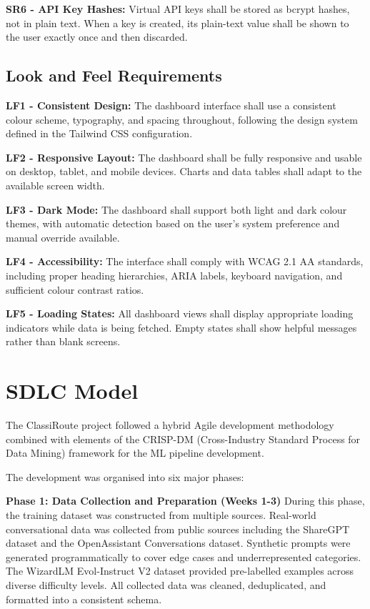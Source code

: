 \documentclass[oneside,12pt,a4paper]{report}
\begin{document}
\textbf{SR6 - API Key Hashes:} Virtual API keys shall be stored as bcrypt hashes, not in plain text. When a key is created, its plain-text value shall be shown to the user exactly once and then discarded.

\subsection{Look and Feel Requirements}

\textbf{LF1 - Consistent Design:} The dashboard interface shall use a consistent colour scheme, typography, and spacing throughout, following the design system defined in the Tailwind CSS configuration.

\textbf{LF2 - Responsive Layout:} The dashboard shall be fully responsive and usable on desktop, tablet, and mobile devices. Charts and data tables shall adapt to the available screen width.

\textbf{LF3 - Dark Mode:} The dashboard shall support both light and dark colour themes, with automatic detection based on the user's system preference and manual override available.

\textbf{LF4 - Accessibility:} The interface shall comply with WCAG 2.1 AA standards, including proper heading hierarchies, ARIA labels, keyboard navigation, and sufficient colour contrast ratios.

\textbf{LF5 - Loading States:} All dashboard views shall display appropriate loading indicators while data is being fetched. Empty states shall show helpful messages rather than blank screens.

\section{SDLC Model}

The ClassiRoute project followed a hybrid Agile development methodology combined with elements of the CRISP-DM (Cross-Industry Standard Process for Data Mining) framework for the ML pipeline development.

The development was organised into six major phases:

\textbf{Phase 1: Data Collection and Preparation (Weeks 1-3)}
During this phase, the training dataset was constructed from multiple sources. Real-world conversational data was collected from public sources including the ShareGPT dataset and the OpenAssistant Conversations dataset. Synthetic prompts were generated programmatically to cover edge cases and underrepresented categories. The WizardLM Evol-Instruct V2 dataset provided pre-labelled examples across diverse difficulty levels. All collected data was cleaned, deduplicated, and formatted into a consistent schema.
\end{document}
